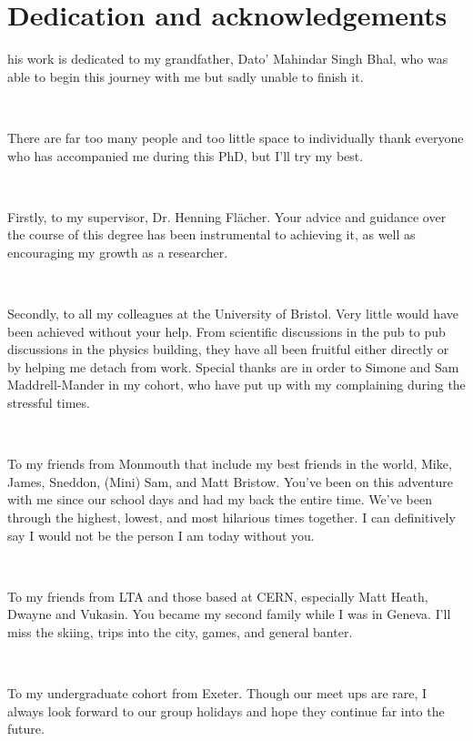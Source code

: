 %
%

\chapter*{Dedication and acknowledgements}
\begin{SingleSpace}
his work is dedicated to my grandfather, Dato' Mahindar Singh Bhal, who was able to begin this journey with me but sadly unable to finish it.

\

There are far too many people and too little space to individually thank everyone who has accompanied me during this PhD, but I'll try my best.

\

Firstly, to my supervisor, Dr. Henning Fl\"{a}cher. Your advice and guidance over the course of this degree has been instrumental to achieving it, as well as encouraging my growth as a researcher.

\

Secondly, to all my colleagues at the University of Bristol. Very little would have been achieved without your help. From scientific discussions in the pub to pub discussions in the physics building, they have all been fruitful either directly or by helping me detach from work. Special thanks are in order to Simone and Sam Maddrell-Mander in my cohort, who have put up with my complaining during the stressful times.

\

To my friends from Monmouth that include my best friends in the world, Mike, James, Sneddon, (Mini) Sam, and Matt Bristow. You've been on this adventure with me since our school days and had my back the entire time. We've been through the highest, lowest, and most hilarious times together. I can definitively say I would not be the person I am today without you.

\

To my friends from LTA and those based at CERN, especially Matt Heath, Dwayne and Vukasin. You became my second family while I was in Geneva. I'll miss the skiing, trips into the city, games, and general banter.

\

To my undergraduate cohort from Exeter. Though our meet ups are rare, I always look forward to our group holidays and hope they continue far into the future.


\end{SingleSpace}
